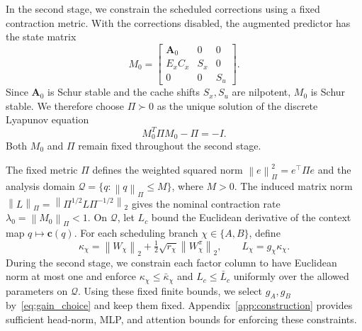 \documentclass[journal]{IEEEtran}
\theoremstyle{plain}
\theoremstyle{definition}
\newcommand{\vc}{\mathbf{c}}
\newcommand{\mA}{\mathbf{A}}
\newcommand{\norm}[1]{\left\lVert #1\right\rVert}
\begin{document}
In the second stage, we constrain the scheduled corrections using a fixed contraction metric. With the corrections disabled, the augmented predictor has the state matrix
\begin{equation}
M_0=\begin{bmatrix}\mA_0&0&0\\E_xC_x&S_x&0\\0&0&S_u\end{bmatrix}.
\label{eq:lyapunov_skeleton}
\end{equation}
Since $\mA_0$ is Schur stable and the cache shifts $S_x,S_u$ are nilpotent, $M_0$ is Schur stable. We therefore choose $\Pi\succ0$ as the unique solution of the discrete Lyapunov equation
\begin{equation*}
M_0^T\Pi M_0-\Pi=-I.
\end{equation*}
Both $M_0$ and $\Pi$ remain fixed throughout the second stage.

The fixed metric $\Pi$ defines the weighted squared norm $\norm{e}_\Pi^2=e^\top\Pi e$ and the analysis domain $\mathcal Q=\{q:\norm{q}_\Pi\le M\}$, where $M>0$. The induced matrix norm $\norm{L}_\Pi=\norm{\Pi^{1/2}L\Pi^{-1/2}}_2$ gives the nominal contraction rate $\lambda_0=\norm{M_0}_\Pi<1$. On $\mathcal Q$, let $L_c$ bound the Euclidean derivative of the context map $q\mapsto\vc(q)$. For each scheduling branch $\chi\in\{A,B\}$, define
\begin{equation}
\kappa_\chi=\norm{W_\chi}_2+\tfrac12\sqrt{r_\chi}\norm{W_\chi^\pi}_2,\qquad L_\chi=g_\chi\kappa_\chi.
\label{eq:Lipschitz_constants}
\end{equation}
During the second stage, we constrain each factor column to have Euclidean norm at most one and enforce $\kappa_\chi\le\bar\kappa_\chi$ and $L_c\le\bar L_c$ uniformly over the allowed parameters on $\mathcal Q$. Using these fixed finite bounds, we select $g_A,g_B$ by~\eqref{eq:gain_choice} and keep them fixed. Appendix~\ref{app:construction} provides sufficient head-norm, MLP, and attention bounds for enforcing these constraints.
\end{document}
